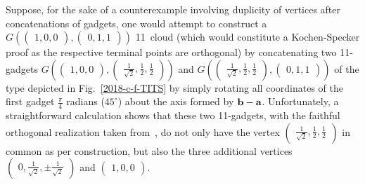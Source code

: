 \documentclass[%
  reprint,
  twocolumn,
 showpacs,
 showkeys,
 preprintnumbers,
 amsmath,amssymb,
 aps,
  prl,
  longbibliography,
 ]{revtex4-1}
\begin{document}
Suppose, for the sake of a counterexample involving duplicity of vertices after concatenations of gadgets, one would attempt to construct a
$G
\left(
\begin{pmatrix}
1,0,0
\end{pmatrix}
,
\begin{pmatrix}
0,1,1
\end{pmatrix}
\right)
$
11~cloud (which would constitute a Kochen-Specker proof as the respective terminal points are orthogonal)
by concatenating two 11-gadgets
$
G
\left(
\begin{pmatrix}
1,0,0
\end{pmatrix}
,
\begin{pmatrix}
 \frac{1}{\sqrt{2}},\frac{1}{2},\frac{1}{2}
\end{pmatrix}
\right)
$
and $
G
\left(
\begin{pmatrix}
 \frac{1}{\sqrt{2}},\frac{1}{2},\frac{1}{2}
\end{pmatrix}
,
\begin{pmatrix}
0,1,1
\end{pmatrix}
\right)
$
of the type depicted in Fig.~\ref{2018-c-f-TITS}
by simply rotating all coordinates of the first gadget $\frac{\pi}{4}$ radians ($45^\circ$) about the axis formed by
${\bf b}-{\bf a}$.
Unfortunately, a straightforward calculation shows that these two 11-gadgets, with the faithful orthogonal realization taken from~\cite[Table~I, p.~102201-7]{2015-AnalyticKS},
do not only have the vertex $\begin{pmatrix}
 \frac{1}{\sqrt{2}},\frac{1}{2},\frac{1}{2}
\end{pmatrix}$
in common as per construction, but also the three additional vertices
$
\begin{pmatrix}
0,\frac{1}{\sqrt{2}},\pm \frac{1}{\sqrt{2}}
\end{pmatrix}
$
and
 $\begin{pmatrix}
 1,0,0
\end{pmatrix}
$.
\end{document}

